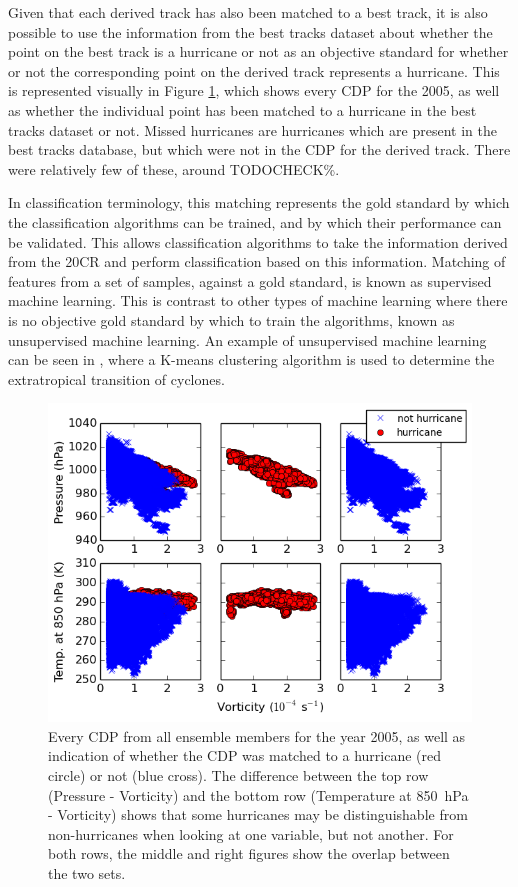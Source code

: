 \documentclass[pdftex,12pt,a4paper]{report}
\begin{document}
Given that each derived track has also been matched to a best track, it is also possible to use the
information from the best tracks dataset about whether the point on the best track is a hurricane or
not as an objective standard for whether or not the corresponding point on the derived track
represents a hurricane. This is represented visually in Figure \ref{fig:cdp_2005_with_hurrs}, which
shows every CDP for the 2005, as well as whether the individual point has been matched to a
hurricane in the best tracks dataset or not. Missed hurricanes are hurricanes which are present in
the best tracks database, but which were not in the CDP for the derived track. There were relatively
few of these, around TODOCHECK\%. 

In classification terminology, this matching represents the gold standard by which the
classification algorithms can be trained, and by which their performance can be validated. This
allows classification algorithms to take the information derived from the 20CR and perform
classification based on this information. Matching of features from a set of samples, against a gold
standard, is known as supervised machine learning. This is contrast to other types of machine
learning where there is no objective gold standard by which to train the algorithms, known as
unsupervised machine learning. An example of unsupervised machine learning can be seen in
\textcite{studholme2014objective}, where a K-means clustering algorithm is used to determine the
extratropical transition of cyclones.

\begin{figure}[hb!]
    \centering
    \includegraphics[width=\textwidth]{figures/cdp_2005_with_hurrs}
    \vspace{-10pt}
    \caption{Every CDP from all ensemble members for the year 2005, as well as indication of whether
        the CDP was matched to a hurricane (red circle) or not (blue cross). The difference between
        the top row (Pressure - Vorticity) and the bottom row (Temperature at \SI{850}{hPa} -
        Vorticity) shows that some hurricanes may be distinguishable from non-hurricanes when
        looking at one variable, but not another. For both rows, the middle and right figures show the
        overlap between the two sets.}
    \label{fig:cdp_2005_with_hurrs}
\end{figure}
\end{document}
